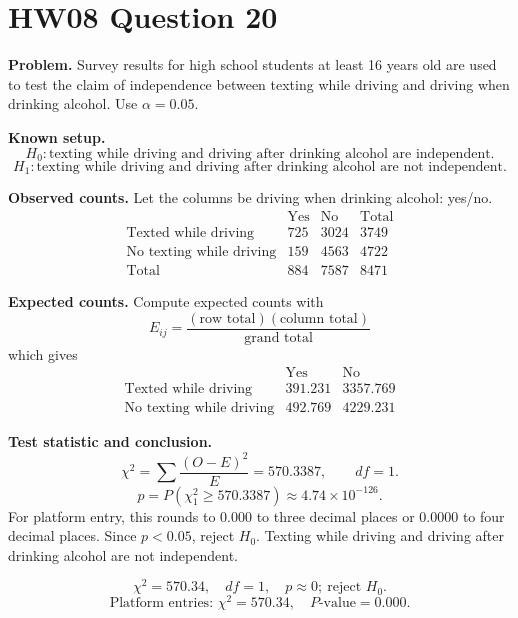\documentclass[11pt]{article}
\begin{document}
\section*{HW08 Question 20}

\textbf{Problem.} Survey results for high school students at least 16 years old are used to test the claim of independence between texting while driving and driving when drinking alcohol. Use \(\alpha=0.05\).

\textbf{Known setup.}
\[
H_0:\text{texting while driving and driving after drinking alcohol are independent.}
\]
\[
H_1:\text{texting while driving and driving after drinking alcohol are not independent.}
\]

\textbf{Observed counts.} Let the columns be driving when drinking alcohol: yes/no.
\[
\begin{array}{c|cc|c}
 & \text{Yes} & \text{No} & \text{Total}\\ \hline
\text{Texted while driving} & 725 & 3024 & 3749\\
\text{No texting while driving} & 159 & 4563 & 4722\\ \hline
\text{Total} & 884 & 7587 & 8471
\end{array}
\]

\textbf{Expected counts.} Compute expected counts with
\[
E_{ij}=\frac{(\text{row total})(\text{column total})}{\text{grand total}}
\]
which gives
\[
\begin{array}{c|cc}
 & \text{Yes} & \text{No}\\ \hline
\text{Texted while driving} & 391.231 & 3357.769\\
\text{No texting while driving} & 492.769 & 4229.231
\end{array}
\]

\textbf{Test statistic and conclusion.}
\[
\chi^2=\sum\frac{(O-E)^2}{E}=570.3387,\qquad df=1.
\]
\[
p=P(\chi^2_1\ge570.3387)\approx4.74\times10^{-126}.
\]
For platform entry, this rounds to \(0.000\) to three decimal places or \(0.0000\) to four decimal places.
Since \(p<0.05\), reject \(H_0\). Texting while driving and driving after drinking alcohol are not independent.

\[
\boxed{\chi^2=570.34,\quad df=1,\quad p\approx0;\ \text{reject }H_0.}
\]
\[
\boxed{\text{Platform entries: }\chi^2=570.34,\quad P\text{-value}=0.000.}
\]
\end{document}
